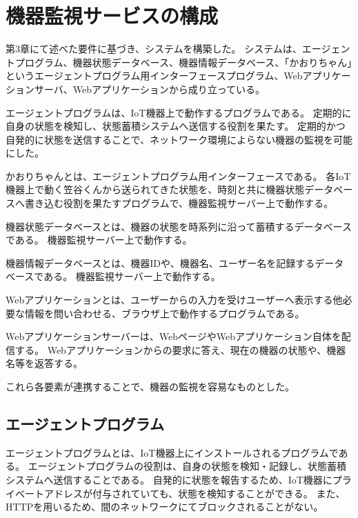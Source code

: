 \section{機器監視サービスの構成}
第3章にて述べた要件に基づき、システムを構築した。
システムは、エージェントプログラム、機器状態データベース、機器情報データベース、「かおりちゃん」というエージェントプログラム用インターフェースプログラム、Webアプリケーションサーバ、Webアプリケーションから成り立っている。
\medskip


エージェントプログラムは、IoT機器上で動作するプログラムである。
定期的に自身の状態を検知し、状態蓄積システムへ送信する役割を果たす。
定期的かつ自発的に状態を送信することで、ネットワーク環境によらない機器の監視を可能にした。
\medskip

かおりちゃんとは、エージェントプログラム用インターフェースである。
各IoT機器上で動く笠谷くんから送られてきた状態を、時刻と共に機器状態データベースへ書き込む役割を果たすプログラムで、機器監視サーバー上で動作する。
\medskip

機器状態データベースとは、機器の状態を時系列に沿って蓄積するデータベースである。
機器監視サーバー上で動作する。
\medskip

機器情報データベースとは、機器IDや、機器名、ユーザー名を記録するデータベースである。
機器監視サーバー上で動作する。
\medskip

Webアプリケーションとは、ユーザーからの入力を受けユーザーへ表示する他必要な情報を問い合わせる、ブラウザ上で動作するプログラムである。
\medskip

Webアプリケーションサーバーは、WebページやWebアプリケーション自体を配信する。
Webアプリケーションからの要求に答え、現在の機器の状態や、機器名等を返答する。
\medskip

これら各要素が連携することで、機器の監視を容易なものとした。

\subsection{エージェントプログラム}
エージェントプログラムとは、IoT機器上にインストールされるプログラムである。
エージェントプログラムの役割は、自身の状態を検知・記録し、状態蓄積システムへ送信することである。
自発的に状態を報告するため、IoT機器にプライベートアドレスが付与されていても、状態を検知することができる。
また、HTTPを用いるため、間のネットワークにてブロックされることがない。

